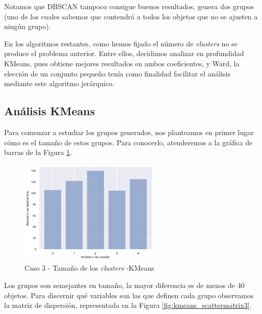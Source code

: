 \documentclass[a4paper, 20pt]{article}
\begin{document}
Notamos que DBSCAN tampoco consigue buenos resultados, genera dos grupos (uno de los cuales sabemos que contendrá a todos los objetos que no se ajusten a ningún grupo).

En los algoritmos restantes, como hemos fijado el número de \textit{clusters} no se produce el problema anterior. Entre ellos, decidimos analizar en profundidad KMeans, pues obtiene mejores resultados en ambos coeficientes, y Ward, la elección de un conjunto pequeño tenía como finalidad facilitar el análisis mediante este algoritmo jerárquico.

\subsection{Análisis KMeans}

Para comenzar a estudiar los grupos generados, nos planteamos en primer lugar cómo es el tamaño de estos grupos. Para conocerlo, atenderemos a la gráfica de barras de la Figura \ref{fig:kmeans_tams3}.

\begin{figure}[H]
    \centering
    \includegraphics[width=0.6\textwidth]{./caso3/KMeans_tam_clusters}
    \caption{Caso 3 - Tamaño de los \textit{clusters} -KMeans}
    \label{fig:kmeans_tams3}
\end{figure}

Los grupos son semejantes en tamaño, la mayor diferencia es de menos de 40 objetos. Para discernir qué variables son las que definen cada grupo observamos la matriz de dispersión, representada en la Figura \ref{fig:kmeans_scattermatrix3}.
\end{document}
